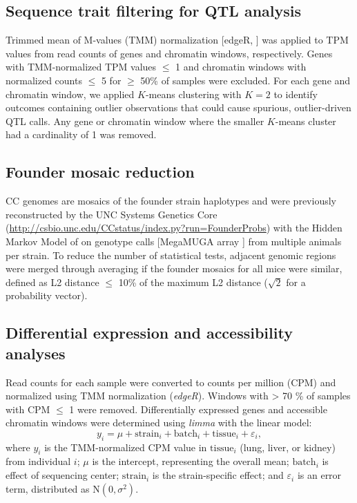 \documentclass[9pt,twocolumn,twoside]{gsajnl}
\begin{document}
\subsection{Sequence trait filtering for QTL analysis}

Trimmed mean of M-values (TMM) normalization [edgeR, \citep{edgeR}] was applied to TPM values from read counts of genes and chromatin windows, respectively. Genes with TMM-normalized TPM values $\leq$ 1 and chromatin windows with normalized counts $\leq$ 5 for $\geq$ 50\% of samples were excluded. For each gene and chromatin window, we applied $K$-means clustering with $K=2$ to identify outcomes containing outlier observations that could cause spurious, outlier-driven QTL calls. Any gene or chromatin window where the smaller $K$-means cluster had a cardinality of 1 was removed.

\subsection{Founder mosaic reduction}

CC genomes are mosaics of the founder strain haplotypes and were previously reconstructed by the UNC Systems Genetics Core (\url{http://csbio.unc.edu/CCstatus/index.py?run=FounderProbs}) with the Hidden Markov Model of \cite{Fu2012} on genotype calls [MegaMUGA array \citep{Morgan2016muga}] from multiple animals per strain. To reduce the number of statistical tests, adjacent genomic regions were merged through averaging if the founder mosaics for all mice were similar, defined as L2 distance $\leq$ 10\% of the maximum L2 distance ($\sqrt{2}$ for a probability vector).

\subsection{Differential expression and accessibility analyses}

Read counts for each sample were converted to counts per million (CPM) and normalized using TMM normalization (\textit{edgeR}). Windows with > 70 \% of samples with CPM $\leq$ 1 were removed. Differentially expressed genes and accessible chromatin windows were determined using \textit{limma} \citep{limma} with the linear model:
\begin{equation}
y_{i} = \mu + \text{strain}_{i} + \text{batch}_{i} + \text{tissue}_{i} + \varepsilon_{i},
\label{eq:limma_model}
\end{equation}
where $y_{i}$ is the TMM-normalized CPM value in $\text{tissue}_{i}$ (lung, liver, or kidney) from individual $i$; $\mu$ is the intercept, representing the overall mean; $\text{batch}_{i}$ is effect of sequencing center; $\text{strain}_i$ is the strain-specific effect; and $\varepsilon_{i}$ is an error term, distributed as $\text{N}(0, \sigma^{2})$.
\end{document}
